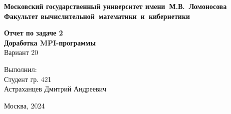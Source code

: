 \begin{titlepage}


\begin{center}
\large{\textbf{Московский государственный университет имени~М.В.~Ломоносова}}\\
\hfill \break
\large{\textbf{Факультет вычислительной~математики~и~кибернетики}}\\
\vspace{6cm}

{\bf\Large Отчет по задаче 2}\\
{\bf\LARGE Доработка MPI-программы}\\
\vspace{1cm}
{\Large Вариант 20}\\


\end{center}
\vspace{3cm}
\begin{flushright}

Выполнил:\\
Студент гр. 421\\
Астраханцев Дмитрий Андреевич\\

\end{flushright}

\vfill
\centerline {\large{Москва, 2024}}

\end{titlepage}
\newpage
